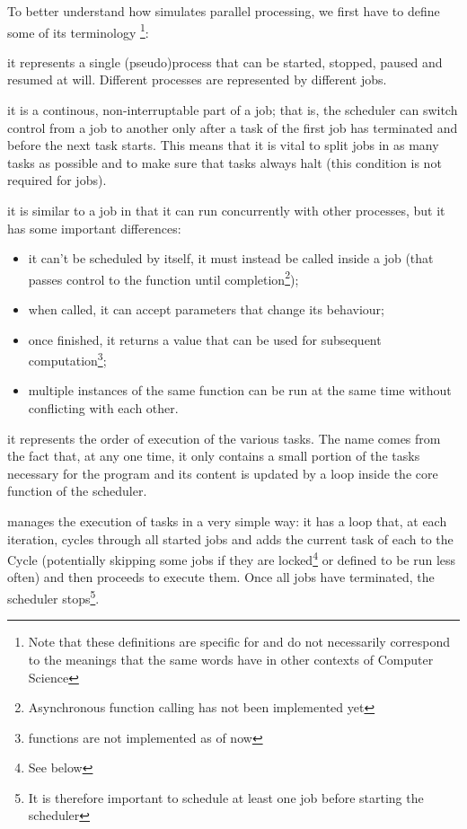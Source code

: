   \beforelist* To better understand how \ScheMo{} simulates parallel processing,
  we first have to define some of its terminology%
  \footnote{Note that these definitions are specific for \ScheMo{} and
  do not necessarily correspond to the meanings that the same words
  have in other contexts of Computer Science}:
  \begin{description}[align=right]
    \item [Job] it represents a single (pseudo)process that can be
      started, stopped, paused and resumed at will. Different
      processes are represented by different jobs.
    \item [Task] it is a continous, non-interruptable part of a job;
      that is, the scheduler can switch control from a job to
      another only after a task of the first job has terminated and
      before the next task starts. This means that it is vital to
      split jobs in as many tasks as possible and to make sure that
      tasks always halt (this condition is not required for jobs).
    \item [Function] it is similar to a job in that it can run
      concurrently with other processes, but it has some important
      differences:
      \begin{itemize}
        \item it can't be scheduled by itself, it must instead be
          called inside a job (that passes control to the function
          until completion\footnote{Asynchronous function calling
          has not been implemented yet});
        \item when called, it can accept parameters that change its
          behaviour;
        \item once finished, it returns a value that can be used for
          subsequent computation\footnote{ functions are
          not implemented as of now};
        \item multiple instances of the same function can be run at
          the same time without conflicting with each other.
      \end{itemize}
    \item [Cycle] it represents the order of execution of the
      various tasks. The name comes from the fact that, at any one
      time, it only contains a small portion of the tasks necessary
      for the program and its content is updated by a loop inside
      the core function of the scheduler.
  \end{description}
  \afterlist*
  \ScheMo{} manages the execution of tasks in a very simple way: it has a
  loop that, at each iteration, cycles through all started jobs and
  adds the current task of each to the Cycle (potentially skipping
  some jobs if they are locked\footnote{See below} or defined to be
  run less often) and then proceeds to execute them. Once all jobs
  have terminated, the scheduler stops\footnote{It is therefore
  important to schedule at least one job before starting the
  scheduler}.

